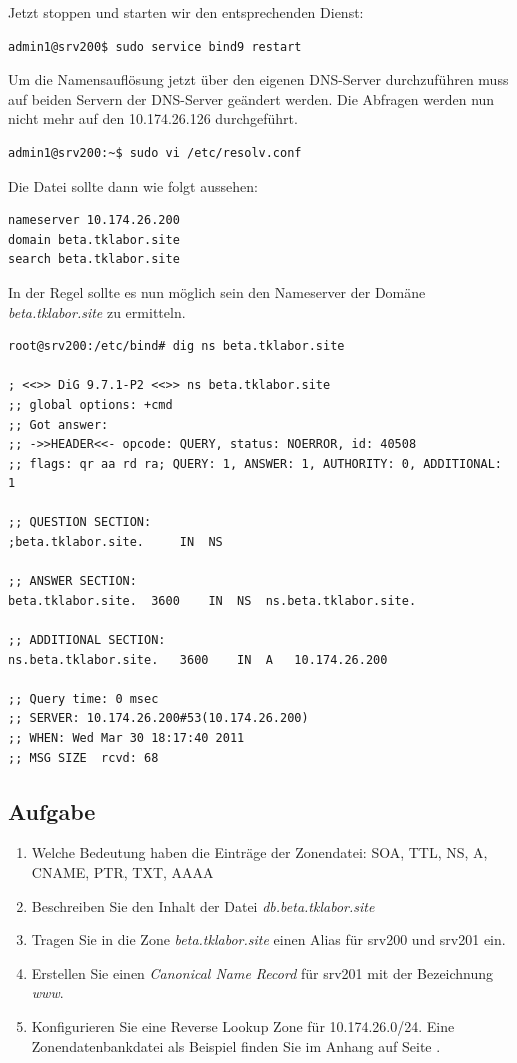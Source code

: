 Jetzt stoppen und starten wir den entsprechenden Dienst:
\begin{lstlisting}
admin1@srv200$ sudo service bind9 restart
\end{lstlisting}

Um die Namensauflösung jetzt über den eigenen DNS-Server durchzuführen muss auf
beiden Servern der DNS-Server geändert werden. Die Abfragen werden nun nicht
mehr auf den 10.174.26.126 durchgeführt.
\begin{lstlisting}
admin1@srv200:~$ sudo vi /etc/resolv.conf
\end{lstlisting}

Die Datei sollte dann wie folgt aussehen:
\begin{scriptsize}
\begin{lstlisting}
nameserver 10.174.26.200
domain beta.tklabor.site
search beta.tklabor.site
\end{lstlisting}
\end{scriptsize}

In der Regel sollte es nun möglich sein den Nameserver der Domäne
\textit{beta.tklabor.site} zu ermitteln.

\begin{scriptsize}
\begin{lstlisting}
root@srv200:/etc/bind# dig ns beta.tklabor.site

; <<>> DiG 9.7.1-P2 <<>> ns beta.tklabor.site
;; global options: +cmd
;; Got answer:
;; ->>HEADER<<- opcode: QUERY, status: NOERROR, id: 40508
;; flags: qr aa rd ra; QUERY: 1, ANSWER: 1, AUTHORITY: 0, ADDITIONAL: 1

;; QUESTION SECTION:
;beta.tklabor.site.		IN	NS

;; ANSWER SECTION:
beta.tklabor.site.	3600	IN	NS	ns.beta.tklabor.site.

;; ADDITIONAL SECTION:
ns.beta.tklabor.site.	3600	IN	A	10.174.26.200

;; Query time: 0 msec
;; SERVER: 10.174.26.200#53(10.174.26.200)
;; WHEN: Wed Mar 30 18:17:40 2011
;; MSG SIZE  rcvd: 68
\end{lstlisting}
\end{scriptsize}

\subsection{Aufgabe}
\begin{enumerate}
  \item Welche Bedeutung haben die Einträge der Zonendatei: SOA, TTL, NS, A,
  CNAME, PTR, TXT, AAAA
  \item Beschreiben Sie den Inhalt der Datei \textit{db.beta.tklabor.site}
  \item Tragen Sie in die Zone \textit{beta.tklabor.site} einen Alias
  für srv200 und srv201 ein.
  \item Erstellen Sie einen \textit{Canonical Name Record} für srv201 mit der
  Bezeichnung \textit{www}.
  \item Konfigurieren Sie eine Reverse Lookup Zone für 10.174.26.0/24. Eine
  Zonendatenbankdatei als Beispiel finden Sie im Anhang auf Seite
  \pageref{cfg:bind-reverse-lookup}.
 \end{enumerate}

